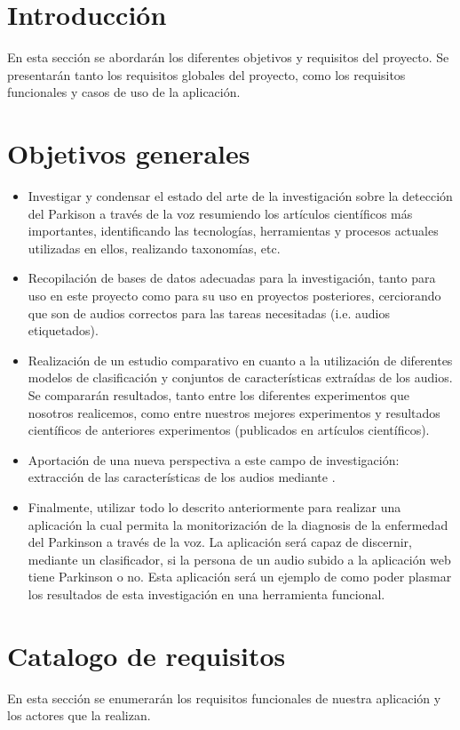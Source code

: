 
\section{Introducción}
En esta sección se abordarán los diferentes objetivos y requisitos del proyecto. Se presentarán tanto los requisitos globales del proyecto, como los requisitos funcionales y casos de uso de la aplicación.

\section{Objetivos generales}
\begin{itemize}
	\item Investigar y condensar el estado del arte de la investigación sobre la detección del Parkison a través de la voz resumiendo los artículos científicos más importantes, identificando las tecnologías, herramientas y procesos actuales utilizadas en ellos, realizando taxonomías, etc.
	\item Recopilación de bases de datos adecuadas para la investigación, tanto para uso en este proyecto como para su uso en proyectos posteriores, cerciorando que son  de audios correctos para las tareas necesitadas (i.e. audios etiquetados).
	\item Realización de un estudio comparativo en cuanto a la utilización de diferentes modelos de clasificación y conjuntos de características extraídas de los audios. Se compararán resultados, tanto entre los diferentes experimentos que nosotros realicemos, como entre nuestros mejores experimentos y resultados científicos de anteriores experimentos (publicados en artículos científicos).
	\item Aportación de una nueva perspectiva a este campo de investigación: extracción de las características de los audios mediante .
	\item Finalmente, utilizar todo lo descrito anteriormente para realizar una aplicación la cual permita la monitorización de la diagnosis de la enfermedad del Parkinson a través de la voz. La aplicación será capaz de discernir, mediante un clasificador, si la persona de un audio subido a la aplicación web tiene Parkinson o no. Esta aplicación será un ejemplo de como poder plasmar los resultados de esta investigación en una herramienta funcional.
\end{itemize}

\section{Catalogo de requisitos}
En esta sección se enumerarán los requisitos funcionales de nuestra aplicación y los actores que la realizan.

